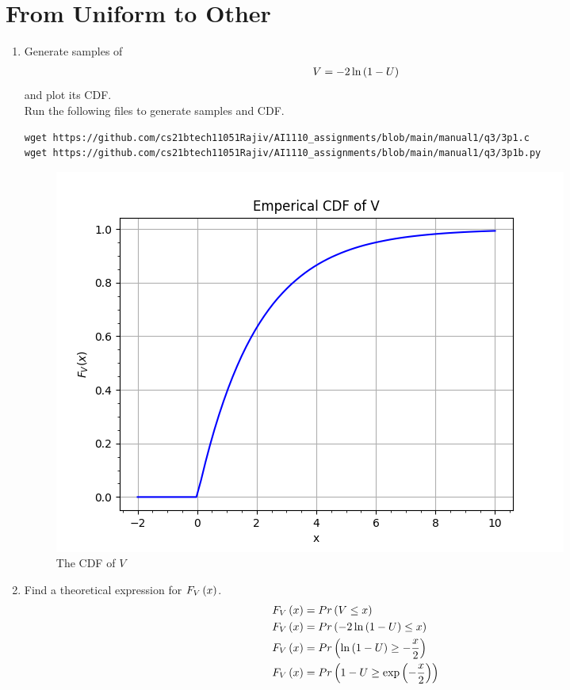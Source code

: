 \documentclass[journal,12pt,twocolumn]{IEEEtran}
\renewcommand\thesection{\arabic{section}}
\begin{document}
\section{From Uniform to Other}
\begin{enumerate}[label=\thesection.\arabic*
,ref=\thesection.\theenumi]
%
\item
Generate samples of 
%
\begin{align}
V = -2\ln\left(1-U\right)
\end{align}
%
and plot its CDF.  
\\
\solution Run the following files to generate samples and CDF.
\begin{lstlisting}
wget https://github.com/cs21btech11051Rajiv/AI1110_assignments/blob/main/manual1/q3/3p1.c
wget https://github.com/cs21btech11051Rajiv/AI1110_assignments/blob/main/manual1/q3/3p1b.py
\end{lstlisting}
\begin{figure}
\centering
\includegraphics[width=\columnwidth]{./figs/fig3.1.png}
\caption{The CDF of $V$}
\label{fig:misc_cdf}
\end{figure}
\item Find a theoretical expression for $F_V\left(x\right)$.
\\
\solution 
\begin{align}
	F_V\brak{x} &= Pr\brak{V\le x} \\
	F_V\brak{x} &= Pr\brak{-2\ln{\brak{1-U}} \le x}	\\
	F_V\brak{x} &= Pr\brak{\ln{\brak{1-U}} \ge -\frac{x}{2}}	\\
	F_V\brak{x} &= Pr\brak{1-U \ge \exp{\brak{-\frac{x}{2}} }}	\\

\end{align}
\end{enumerate}
\end{document}
